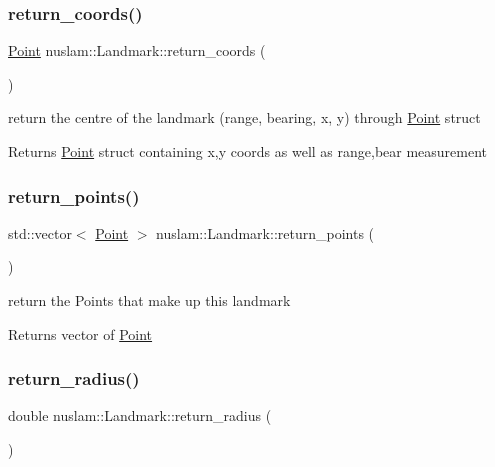 \subsubsection{\texorpdfstring{return\+\_\+coords()}{return\_coords()}}
{\footnotesize\ttfamily \hyperlink{structnuslam_1_1Point}{Point} nuslam\+::\+Landmark\+::return\+\_\+coords (\begin{DoxyParamCaption}{ }\end{DoxyParamCaption})}



return the centre of the landmark (range, bearing, x, y) through \hyperlink{structnuslam_1_1Point}{Point} struct 

\begin{DoxyReturn}{Returns}
\hyperlink{structnuslam_1_1Point}{Point} struct containing x,y coords as well as range,bear measurement 
\end{DoxyReturn}
\mbox{\label{classnuslam_1_1Landmark_abe1f30f91e48914c4ecddc5aad06754f}} 
\subsubsection{\texorpdfstring{return\+\_\+points()}{return\_points()}}
{\footnotesize\ttfamily std\+::vector$<$ \hyperlink{structnuslam_1_1Point}{Point} $>$ nuslam\+::\+Landmark\+::return\+\_\+points (\begin{DoxyParamCaption}{ }\end{DoxyParamCaption})}



return the Points that make up this landmark 

\begin{DoxyReturn}{Returns}
vector of \hyperlink{structnuslam_1_1Point}{Point} 
\end{DoxyReturn}
\mbox{\label{classnuslam_1_1Landmark_a298ca8852eb6bfeb414eee3e17bc2de8}} 
\subsubsection{\texorpdfstring{return\+\_\+radius()}{return\_radius()}}
{\footnotesize\ttfamily double nuslam\+::\+Landmark\+::return\+\_\+radius (\begin{DoxyParamCaption}{ }\end{DoxyParamCaption})}



